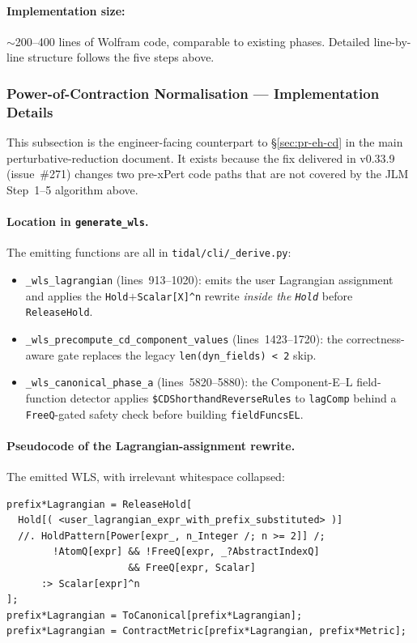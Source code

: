 \paragraph{Implementation size:} $\sim$200--400 lines of Wolfram code, comparable to existing phases. Detailed line-by-line structure follows the five steps above.

\subsubsection{Power-of-Contraction Normalisation --- Implementation Details}
\label{sec:prd-power-normalisation}

This subsection is the engineer-facing counterpart to \S\ref{sec:pr-eh-cd} in the main perturbative-reduction document. It exists because the fix delivered in v0.33.9 (issue~\#271) changes two pre-xPert code paths that are not covered by the JLM Step~1--5 algorithm above.

\paragraph{Location in \texttt{generate\_wls}.} The emitting functions are all in \verb|tidal/cli/_derive.py|:
\begin{itemize}
  \item \verb|_wls_lagrangian| (lines~913--1020): emits the user Lagrangian assignment and applies the \texttt{Hold}$+$\texttt{Scalar[X]\textasciicircum n} rewrite \emph{inside the \texttt{Hold}} before \texttt{ReleaseHold}.
  \item \verb|_wls_precompute_cd_component_values| (lines~1423--1720): the correctness-aware gate replaces the legacy \verb|len(dyn_fields) < 2| skip.
  \item \verb|_wls_canonical_phase_a| (lines~5820--5880): the Component-E--L field-function detector applies \verb|$CDShorthandReverseRules| to \verb|lagComp| behind a \verb|FreeQ|-gated safety check before building \verb|fieldFuncsEL|.
\end{itemize}

\paragraph{Pseudocode of the Lagrangian-assignment rewrite.} The emitted WLS, with irrelevant whitespace collapsed:
\begin{verbatim}
prefix*Lagrangian = ReleaseHold[
  Hold[( <user_lagrangian_expr_with_prefix_substituted> )]
  //. HoldPattern[Power[expr_, n_Integer /; n >= 2]] /;
        !AtomQ[expr] && !FreeQ[expr, _?AbstractIndexQ]
                     && FreeQ[expr, Scalar]
      :> Scalar[expr]^n
];
prefix*Lagrangian = ToCanonical[prefix*Lagrangian];
prefix*Lagrangian = ContractMetric[prefix*Lagrangian, prefix*Metric];
\end{verbatim}

